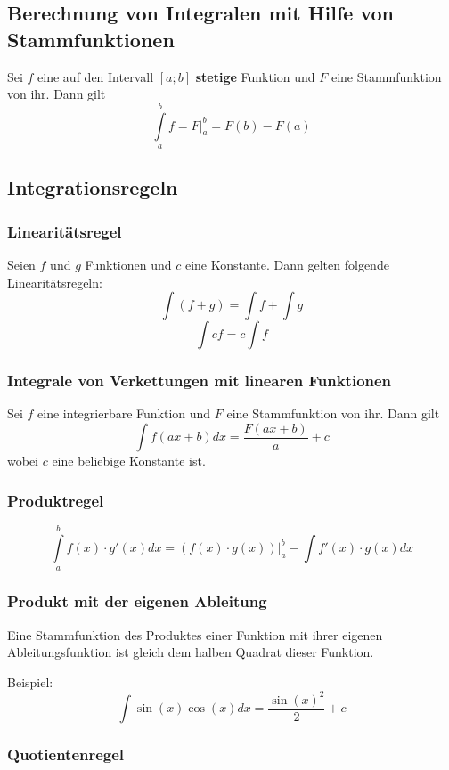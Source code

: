 \subsection{Berechnung von Integralen mit Hilfe von Stammfunktionen}

Sei $f$ eine auf den Intervall $[a;b]$ \textbf{stetige} Funktion und $F$ eine
Stammfunktion von ihr. Dann gilt
$$\int\limits_a^b f = F\Big |_a^b = F(b) - F(a)$$


\subsection{Integrationsregeln}


\subsubsection{Linearitätsregel}

Seien $f$ und $g$ Funktionen und $c$ eine Konstante. Dann gelten folgende
Linearitätsregeln:
$$\int (f+g) = \int f + \int g$$
$$\int cf = c \int f$$


\subsubsection{Integrale von Verkettungen mit linearen Funktionen}

Sei $f$ eine integrierbare Funktion und $F$ eine Stammfunktion von ihr. Dann
gilt
$$\int f(ax+b)dx = \frac{F(ax+b)}{a} + c$$
wobei $c$ eine beliebige Konstante ist.


\subsubsection{Produktregel}

$$\int\limits_a^b f(x) \cdot g'(x) dx = (f(x) \cdot g(x))\Big |_a^b
    - \int f'(x) \cdot g(x) dx$$


\subsubsection{Produkt mit der eigenen Ableitung} 

Eine Stammfunktion des Produktes einer Funktion mit ihrer eigenen
Ableitungsfunktion ist gleich dem halben Quadrat dieser Funktion.

Beispiel:
$$\int \sin(x) \cos(x) dx = \frac{\sin(x)^2}{2} + c$$


\subsubsection{Quotientenregel}

